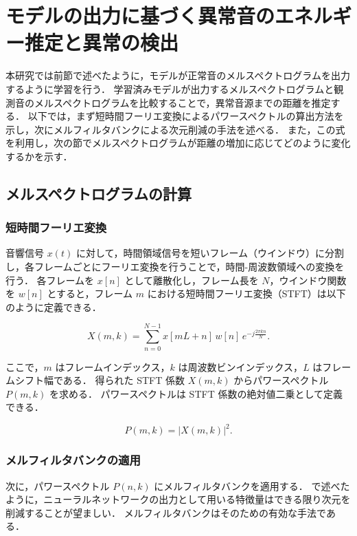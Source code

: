 \documentclass[../main]{subfiles}
\begin{document}
\section{モデルの出力に基づく異常音のエネルギー推定と異常の検出}
\label{sec:pmethod_distance_estimation}

本研究では前節で述べたように，モデルが正常音のメルスペクトログラムを出力するように学習を行う．
学習済みモデルが出力するメルスペクトログラムと観測音のメルスペクトログラムを比較することで，異常音源までの距離を推定する．
以下では，まず短時間フーリエ変換によるパワースペクトルの算出方法を示し，次にメルフィルタバンクによる次元削減の手法を述べる．
また，この式を利用し，次の節でメルスペクトログラムが距離の増加に応じてどのように変化するかを示す．

\subsection{メルスペクトログラムの計算}

\subsubsection{短時間フーリエ変換}
音響信号 $x(t)$ に対して，時間領域信号を短いフレーム（ウインドウ）に分割し，各フレームごとにフーリエ変換を行うことで，時間-周波数領域への変換を行う．
各フレームを $x[n]$ として離散化し，フレーム長を $N$，ウインドウ関数を $w[n]$ とすると，フレーム $m$ における短時間フーリエ変換（STFT）は以下のように定義できる．

\begin{equation}
X(m, k) = \sum_{n=0}^{N-1} x[mL + n]\, w[n]\, e^{-j \frac{2\pi k n}{N}}.
\end{equation}

ここで，$m$ はフレームインデックス，$k$ は周波数ビンインデックス，$L$ はフレームシフト幅である．
得られた STFT 係数 $X(m, k)$ からパワースペクトル $P(m, k)$ を求める．
パワースペクトルは STFT 係数の絶対値二乗として定義できる．

\begin{equation}
P(m, k) = |X(m, k)|^2.
\end{equation}

\subsubsection{メルフィルタバンクの適用}
次に，パワースペクトル \(P(n, k)\) にメルフィルタバンクを適用する．
 で述べたように，ニューラルネットワークの出力として用いる特徴量はできる限り次元を削減することが望ましい．
メルフィルタバンクはそのための有効な手法である．
\end{document}
